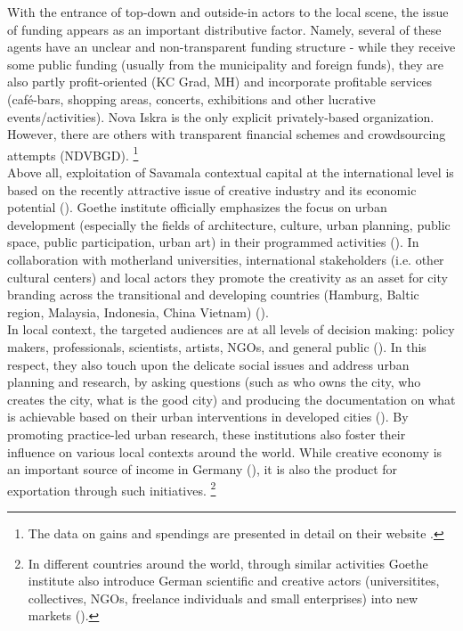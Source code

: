 \documentclass[11pt]{report}
\begin{document}
With the entrance of top-down and outside-in actors to the local scene, the issue of funding appears as an important distributive factor.
Namely, several of these agents have an unclear and non-transparent funding structure - while they receive some public funding (usually from the municipality and foreign funds), they are also partly profit-oriented (KC Grad, MH) and incorporate profitable services (café-bars, shopping areas, concerts, exhibitions and other lucrative events/activities).
Nova Iskra is the only explicit privately-based organization.
However, there are others with transparent financial schemes and crowdsourcing attempts (NDVBGD).
\footnote{The data on gains and spendings are presented in detail on their website \cite{NDVBGD website}.}
\\

Above all, exploitation of Savamala contextual capital at the international level is based on the recently attractive issue of creative industry and its economic potential (\cite{Landry2012}).
Goethe institute officially emphasizes the focus on urban development (especially the fields of architecture, culture, urban planning, public space, public participation, urban art) in their programmed activities (\cite{Architecture-Goethe institute website}).
In collaboration with motherland universities, international stakeholders (i.e. other cultural centers) and local actors they promote the creativity as an asset for city branding across the transitional and developing countries (Hamburg, Baltic region, Malaysia, Indonesia, China Vietnam) (\citealt{waibel_creativity_2014}).
\\

In local context, the targeted audiences are at all levels of decision making: policy makers, professionals, scientists, artists, NGOs, and general public (\cite{British council}).
In this respect, they also touch upon the delicate social issues and address urban planning and research, by asking questions (such as who owns the city, who creates the city, what is the good city) and producing the documentation on what is achievable based on their urban interventions in developed cities (\cite{Urban places public spaces}).
By promoting practice-led urban research, these institutions also foster their influence on various local contexts around the world.
While creative economy is an important source of income in Germany (\cite{ref}), it is also the product for exportation through such initiatives. \footnote{In different countries around the world, through similar activities Goethe institute also introduce German scientific and creative actors (universitites, collectives, NGOs, freelance individuals and small enterprises) into new markets (\citealt{waibel_creativity_2014}).}
\\
\end{document}
